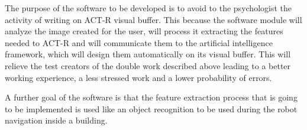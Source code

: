 	The purpose of the software to be developed is to avoid to the psychologist the activity of writing on ACT-R visual buffer. This because the software module will analyze the image created for the user, will process it extracting the features needed to ACT-R and will communicate them to the artificial intelligence framework, which will design them automatically on its visual buffer. 
	This will relieve the test creators of the double work described above leading to a better working experience, a less stressed work and a lower probability of errors.
	

	A further goal of the software is that the feature extraction process that is going to be implemented is used like an object recognition to be used during the robot navigation inside a building. 
	



